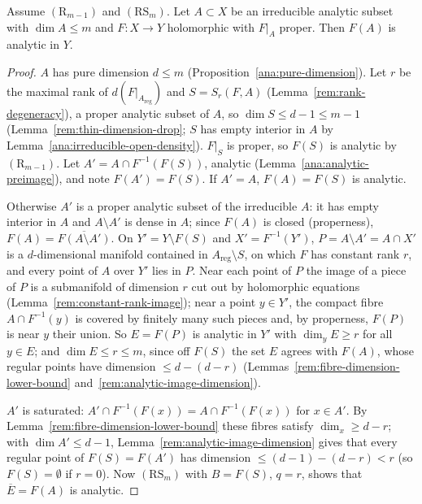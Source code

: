 \begin{lemma}
\label{rem:proper-image-irreducible}
\leanok
Assume \((\mathrm R_{m-1})\) and \((\mathrm{RS}_m)\). Let \(A\subset X\) be an irreducible analytic subset with \(\dim A\le m\) and \(F\colon X\to Y\) holomorphic with
\(F|_A\) proper. Then \(F(A)\) is analytic in \(Y\).
\end{lemma}
\begin{proof}
\leanok
\(A\) has pure dimension \(d\le m\) (Proposition~\ref{ana:pure-dimension}). Let \(r\) be the maximal rank of \(d(F|_{A_{\mathrm{reg}}})\) and \(S=S_r(F,A)\)
(Lemma~\ref{rem:rank-degeneracy}), a proper analytic subset of \(A\), so \(\dim S\le d-1\le m-1\) (Lemma~\ref{rem:thin-dimension-drop}; \(S\) has empty interior in
\(A\) by Lemma~\ref{ana:irreducible-open-density}). \(F|_S\) is proper, so \(F(S)\) is analytic by \((\mathrm R_{m-1})\). Let \(A'=A\cap F^{-1}(F(S))\), analytic
(Lemma~\ref{ana:analytic-preimage}), and note \(F(A')=F(S)\). If \(A'=A\), \(F(A)=F(S)\) is analytic.

Otherwise \(A'\) is a proper analytic subset of the irreducible \(A\): it has empty interior in \(A\) and \(A\setminus A'\) is dense in \(A\); since \(F(A)\) is
closed (properness), \(F(A)=\overline{F(A\setminus A')}\). On \(Y'=Y\setminus F(S)\) and \(X'=F^{-1}(Y')\), \(P=A\setminus A'=A\cap X'\) is a \(d\)-dimensional manifold
contained in \(A_{\mathrm{reg}}\setminus S\), on which \(F\) has constant rank \(r\), and every point of \(A\) over \(Y'\) lies in \(P\). Near each point of \(P\) the image
of a piece of \(P\) is a submanifold of dimension \(r\) cut out by holomorphic equations (Lemma~\ref{rem:constant-rank-image}); near a point \(y\in Y'\), the
compact fibre \(A\cap F^{-1}(y)\) is covered by finitely many such pieces and, by properness, \(F(P)\) is near \(y\) their union. So \(E=F(P)\) is analytic in
\(Y'\) with \(\dim_yE\ge r\) for all \(y\in E\); and \(\dim E\le r\le m\), since off \(F(S)\) the set \(E\) agrees with \(F(A)\), whose regular points have dimension
\(\le d-(d-r)\) (Lemmas~\ref{rem:fibre-dimension-lower-bound} and~\ref{rem:analytic-image-dimension}).

\(A'\) is saturated: \(A'\cap F^{-1}(F(x))=A\cap F^{-1}(F(x))\) for \(x\in A'\). By Lemma~\ref{rem:fibre-dimension-lower-bound} these fibres satisfy
\(\dim_x\ge d-r\); with \(\dim A'\le d-1\), Lemma~\ref{rem:analytic-image-dimension} gives that every regular point of \(F(S)=F(A')\) has dimension
\(\le(d-1)-(d-r)<r\) (so \(F(S)=\emptyset\) if \(r=0\)). Now \((\mathrm{RS}_m)\) with \(B=F(S)\), \(q=r\), shows that \(\overline E=F(A)\) is analytic.
\end{proof}

